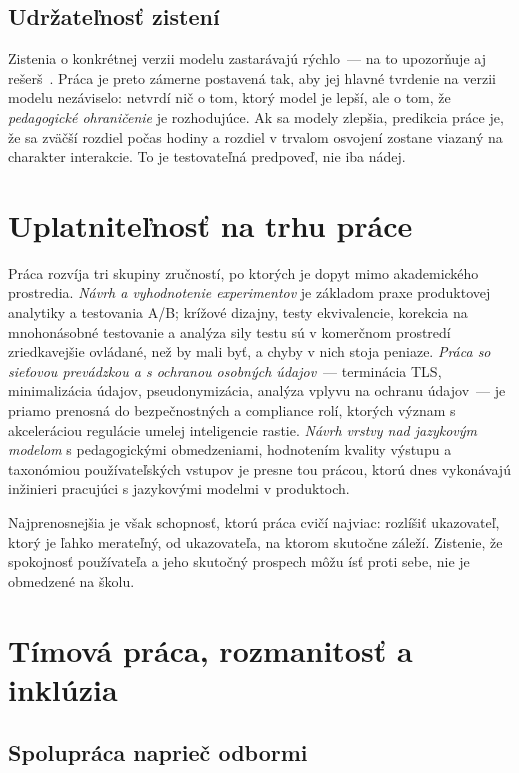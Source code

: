 \subsection{Udržateľnosť zistení}

Zistenia o konkrétnej verzii modelu zastarávajú rýchlo~--- na to upozorňuje aj rešerš~\cite{garzon2025systematic}. Práca je preto zámerne postavená tak, aby jej hlavné tvrdenie na verzii modelu nezáviselo: netvrdí nič o tom, ktorý model je lepší, ale o tom, že \emph{pedagogické ohraničenie} je rozhodujúce. Ak sa modely zlepšia, predikcia práce je, že sa zväčší rozdiel počas hodiny a rozdiel v trvalom osvojení zostane viazaný na charakter interakcie. To je testovateľná predpoveď, nie iba nádej.

\section{Uplatniteľnosť na trhu práce}
\label{sec:uplatnitelnost}

Práca rozvíja tri skupiny zručností, po ktorých je dopyt mimo akademického prostredia. \emph{Návrh a vyhodnotenie experimentov} je základom praxe produktovej analytiky a testovania A/B; krížové dizajny, testy ekvivalencie, korekcia na mnohonásobné testovanie a analýza sily testu sú v komerčnom prostredí zriedkavejšie ovládané, než by mali byť, a chyby v nich stoja peniaze. \emph{Práca so sieťovou prevádzkou a s ochranou osobných údajov}~--- terminácia TLS, minimalizácia údajov, pseudonymizácia, analýza vplyvu na ochranu údajov~--- je priamo prenosná do bezpečnostných a compliance rolí, ktorých význam s akceleráciou regulácie umelej inteligencie rastie. \emph{Návrh vrstvy nad jazykovým modelom} s pedagogickými obmedzeniami, hodnotením kvality výstupu a taxonómiou používateľských vstupov je presne tou prácou, ktorú dnes vykonávajú inžinieri pracujúci s jazykovými modelmi v produktoch.

Najprenosnejšia je však schopnosť, ktorú práca cvičí najviac: rozlíšiť ukazovateľ, ktorý je ľahko merateľný, od ukazovateľa, na ktorom skutočne záleží. Zistenie, že spokojnosť používateľa a jeho skutočný prospech môžu ísť proti sebe, nie je obmedzené na školu.

\section{Tímová práca, rozmanitosť a inklúzia}
\label{sec:tim}

\subsection{Spolupráca naprieč odbormi}

